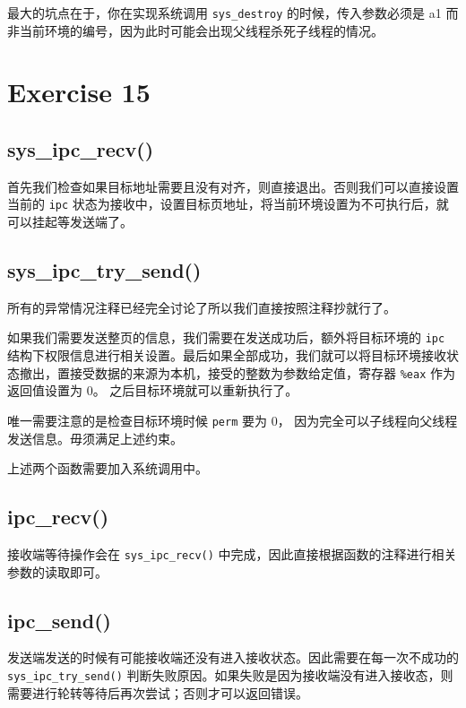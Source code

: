 \documentclass[11pt]{article}
\begin{document}
	\par 最大的坑点在于，你在实现系统调用 \texttt{sys\_destroy} 的时候，传入参数必须是 a1 而非当前环境的编号，因为此时可能会出现父线程杀死子线程的情况。	
	
	\section{Exercise 15}
		
	\subsection*{sys\_ipc\_recv()}
		
	\par 首先我们检查如果目标地址需要且没有对齐，则直接退出。否则我们可以直接设置当前的 \texttt{ipc} 状态为接收中，设置目标页地址，将当前环境设置为不可执行后，就可以挂起等发送端了。
	
	\subsection*{sys\_ipc\_try\_send()}
	
	\par 所有的异常情况注释已经完全讨论了所以我们直接按照注释抄就行了。
	
	\par 如果我们需要发送整页的信息，我们需要在发送成功后，额外将目标环境的 \texttt{ipc} 结构下权限信息进行相关设置。最后如果全部成功，我们就可以将目标环境接收状态撤出，置接受数据的来源为本机，接受的整数为参数给定值，寄存器 \texttt{\%eax} 作为返回值设置为 0。 之后目标环境就可以重新执行了。
	
	\par 唯一需要注意的是检查目标环境时候 \texttt{perm} 要为 0， 因为完全可以子线程向父线程发送信息。毋须满足上述约束。
	
	\par 上述两个函数需要加入系统调用中。
	
	\subsection*{ipc\_recv()}
	
	\par 接收端等待操作会在 \texttt{sys\_ipc\_recv()} 中完成，因此直接根据函数的注释进行相关参数的读取即可。
		
	\subsection*{ipc\_send()}
	
	\par 发送端发送的时候有可能接收端还没有进入接收状态。因此需要在每一次不成功的 \texttt{sys\_ipc\_try\_send()} 判断失败原因。如果失败是因为接收端没有进入接收态，则需要进行轮转等待后再次尝试；否则才可以返回错误。
	
		
	
		
	
	
			
\end{document}
